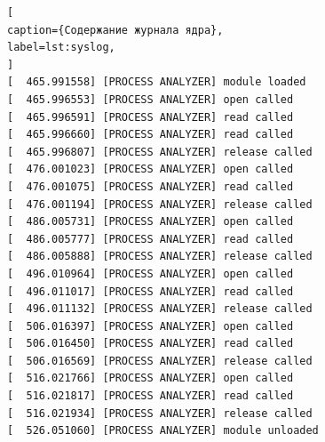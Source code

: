 \begin{lstlisting}[
caption={Содержание журнала ядра},
label=lst:syslog,
]
[  465.991558] [PROCESS ANALYZER] module loaded
[  465.996553] [PROCESS ANALYZER] open called
[  465.996591] [PROCESS ANALYZER] read called
[  465.996660] [PROCESS ANALYZER] read called
[  465.996807] [PROCESS ANALYZER] release called
[  476.001023] [PROCESS ANALYZER] open called
[  476.001075] [PROCESS ANALYZER] read called
[  476.001194] [PROCESS ANALYZER] release called
[  486.005731] [PROCESS ANALYZER] open called
[  486.005777] [PROCESS ANALYZER] read called
[  486.005888] [PROCESS ANALYZER] release called
[  496.010964] [PROCESS ANALYZER] open called
[  496.011017] [PROCESS ANALYZER] read called
[  496.011132] [PROCESS ANALYZER] release called
[  506.016397] [PROCESS ANALYZER] open called
[  506.016450] [PROCESS ANALYZER] read called
[  506.016569] [PROCESS ANALYZER] release called
[  516.021766] [PROCESS ANALYZER] open called
[  516.021817] [PROCESS ANALYZER] read called
[  516.021934] [PROCESS ANALYZER] release called
[  526.051060] [PROCESS ANALYZER] module unloaded
\end{lstlisting}


